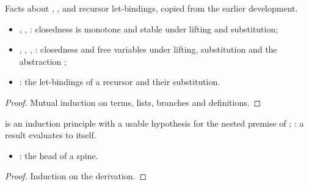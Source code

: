 \begin{lemma}
  \leanok
   Facts about , ,  and recursor let-bindings, copied from the earlier development.
  \begin{itemize}
  \item {}, , : closedness is monotone and stable under lifting and substitution;
  \item {}, , , : closedness and free variables under lifting, substitution and the abstraction ;
  \item {}: the let-bindings of a recursor and their substitution.
  \end{itemize}
\end{lemma}
\begin{proof}
  \leanok
   Mutual induction on terms, lists, branches and definitions.
\end{proof}

\begin{lemma}
  \label{lem:EraseProof-LBEval-idem}
  \leanok
    is an induction principle with a usable hypothesis for the nested premise of ; : a result evaluates to itself.
  \begin{itemize}
  \item {}: the head of a spine.
  \end{itemize}
\end{lemma}
\begin{proof}
  \leanok
   Induction on the derivation.
\end{proof}

